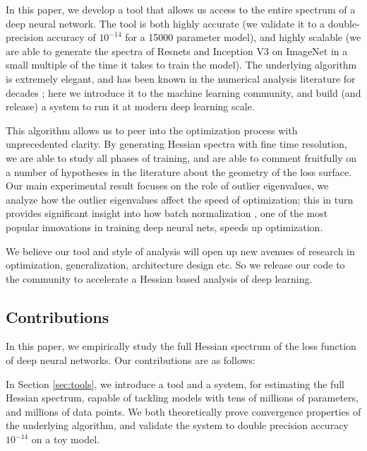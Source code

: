 \documentclass{article}
\begin{document}
In this paper, we develop a tool that allows us access to the entire spectrum of a deep neural network. The tool is both highly accurate (we validate it to a double-precision accuracy of $10^{-14}$ for a 15000 parameter model), and highly scalable (we are able to generate the spectra of Resnets \cite{he2016deep} and Inception V3 \cite{szegedy2016rethinking} on ImageNet in a small multiple of the time it takes to train the model). The underlying algorithm is extremely elegant, and has been known in the numerical analysis literature for decades \cite{golub1969calculation}; here we introduce it to the machine learning community, and build (and release) a system to run it at modern deep learning scale.

This algorithm allows us to peer into the optimization process with  unprecedented clarity. By generating Hessian spectra with fine time resolution, we are able to study all phases of training, and are able to comment fruitfully on a number of hypotheses in the literature about the geometry of the loss surface. Our main experimental result focuses on the role of outlier eigenvalues, we analyze how the outlier eigenvalues affect the speed of optimization; this in turn provides significant insight into how batch normalization \cite{ioffe2015batch}, one of the most popular innovations in training deep neural nets, speeds up optimization.

We believe our tool and style of analysis will open up new avenues of research in optimization, generalization, architecture design etc. So we release our code to the community to accelerate a Hessian based analysis of deep learning.



\subsection{Contributions}
In this paper, we empirically study the full Hessian spectrum of the loss function of deep neural networks. Our contributions are as follows:

In Section \ref{sec:tools}, we introduce a tool and a system, for estimating the full Hessian spectrum, capable of tackling models with tens of millions of parameters, and millions of data points. We both theoretically prove convergence properties of the underlying algorithm, and validate the system to double precision accuracy $10^{-14}$ on a toy model.
\end{document}
